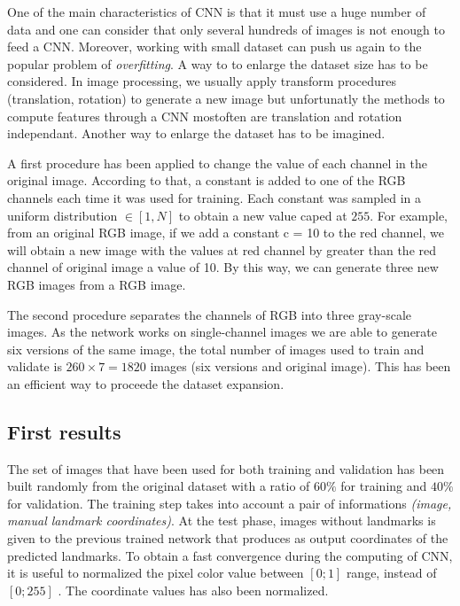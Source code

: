 \documentclass[10pt]{article}
\begin{document}
One of the main characteristics of CNN is that it must use a huge number of data 
and one can consider that only several hundreds of images is
not enough to feed a CNN. Moreover, working with small dataset can push
us again to the popular problem of \textit{overfitting}. A way to  to
enlarge the dataset size has to be considered. In image processing, we usually apply
transform procedures (translation, rotation) to generate a new image
but unfortunatly the methods to compute features through a CNN
mostoften are translation and rotation independant. Another way to
enlarge the dataset has to be imagined.


A first procedure has been applied to change the value of each
channel in the original image. According to that, a constant is
added to one of the RGB channels each time it was used for training.
Each constant was sampled in a uniform distribution $\in [1,N]$ to obtain
a new value caped at $255$. For example, from
an original RGB image, if we add a constant c = 10 to the
red channel, we will obtain a new image with the values at
red channel by greater than the red channel of original image
a value of 10. By this way, we can generate three new RGB
images from a RGB image.

The second procedure separates the channels of RGB into
three gray-scale images. As the network works on single-channel images
we are able to  generate six versions of the same image, the total number of
images used to train and validate is $260 \times 7 = 1820$ images
(six versions and original image). This has been an efficient way to
proceede the dataset expansion. 


\subsection{First results}
\label{sectrain1}
The set of images that have been used for both training and validation
has been built randomly from the original dataset with a ratio of
$60\%$ for training and $40\%$ for  validation. The training step
takes into account a pair of informations \textit{(image, manual
  landmark coordinates)}. At the test phase, images without landmarks
is given to the previous trained network that produces as output
coordinates of the predicted landmarks. To obtain a fast convergence
during the computing of CNN, it is useful to normalized the pixel
color value between $[0; 1]$ range, instead of $[0; 255]$  \cite{lecun2012efficient}. The
coordinate values has also been normalized.
\end{document}
